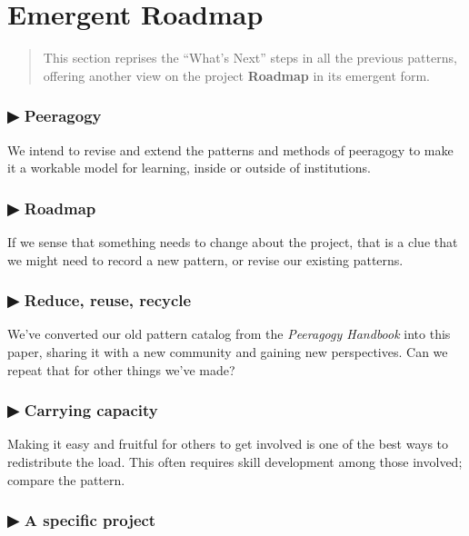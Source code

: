 \hypertarget{emergent-roadmap}{%
\section{Emergent Roadmap}\label{emergent-roadmap}}

\begin{quote}
This section reprises the ``What's Next'' steps in all the previous
patterns, offering another view on the project \textbf{Roadmap} in its
emergent form.
\end{quote}

\hypertarget{peeragogy}{%
\subsubsection{▶ Peeragogy}\label{peeragogy}}

We intend to revise and extend the patterns and methods of peeragogy to
make it a workable model for learning, inside or outside of
institutions.

\hypertarget{roadmap}{%
\subsubsection{▶ Roadmap}\label{roadmap}}

If we sense that something needs to change about the project, that is a
clue that we might need to record a new pattern, or revise our existing
patterns.

\hypertarget{reduce-reuse-recycle}{%
\subsubsection{▶ Reduce, reuse, recycle}\label{reduce-reuse-recycle}}

We've converted our old pattern catalog from the \emph{Peeragogy
Handbook} into this paper, sharing it with a new community and gaining
new perspectives. Can we repeat that for other things we've made?

\hypertarget{carrying-capacity}{%
\subsubsection{▶ Carrying capacity}\label{carrying-capacity}}

Making it easy and fruitful for others to get involved is one of the
best ways to redistribute the load. This often requires skill
development among those involved; compare the pattern.

\hypertarget{a-specific-project}{%
\subsubsection{▶ A specific project}\label{a-specific-project}}

